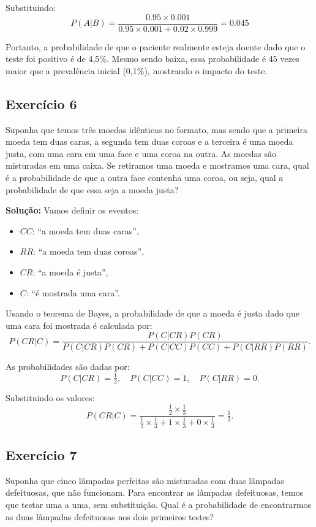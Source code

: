 \documentclass{article}
\begin{document}
Substituindo:
    $$
    P(A|B) = \frac{0.95 \times 0.001}{0.95 \times 0.001 + 0.02 \times 0.999}
    = 0.045
    $$

Portanto, a probabilidade de que o paciente realmente esteja doente dado que o teste foi positivo é de 4,5\%.  
Mesmo sendo baixa, essa probabilidade é 45 vezes maior que a prevalência inicial (0,1\%), mostrando o impacto do teste.

\subsection{Exercício 6}
Suponha que temos três moedas idênticas no formato, mas sendo que a primeira moeda tem duas caras, a segunda tem duas coroas e a terceira é uma moeda justa, com uma cara em uma face e uma coroa na outra. As moedas são misturadas em uma caixa. Se retiramos uma moeda e mostramos uma cara, qual é a probabilidade de que a outra face contenha uma coroa, ou seja, qual a probabilidade de que essa seja a moeda justa?

\vspace{0.5cm}
\textbf{Solução:} Vamos definir os eventos:
\begin{itemize}
    \item $CC$: ``a moeda tem duas caras'',
    \item $RR$: ``a moeda tem duas coroas'',
    \item $CR$: ``a moeda é justa'',
    \item $C$: ``é mostrada uma cara''.
\end{itemize}

Usando o teorema de Bayes, a probabilidade de que a moeda é justa dado que uma cara foi mostrada é calculada por:
    $$
    P(CR|C) = \frac{P(C|CR)P(CR)}{P(C|CR)P(CR) + P(C|CC)P(CC) + P(C|RR)P(RR)}.
    $$
    
As probabilidades são dadas por:
    $$
    P(C|CR) = \tfrac{1}{2}, \quad P(C|CC) = 1, \quad P(C|RR) = 0.
    $$
    
Substituindo os valores:
    $$
    P(CR|C) = \frac{\tfrac{1}{2}\times \tfrac{1}{3}}{\tfrac{1}{2}\times \tfrac{1}{3} + 1\times \tfrac{1}{3} + 0\times \tfrac{1}{3}} = \tfrac{1}{3}.
    $$

\subsection{Exercício 7}
Suponha que cinco lâmpadas perfeitas são misturadas com duas lâmpadas defeituosas, que não funcionam. Para encontrar as lâmpadas defeituosas, temos que testar uma a uma, sem substituição. Qual é a probabilidade de encontrarmos as duas lâmpadas defeituosas nos dois primeiros testes?
\end{document}
